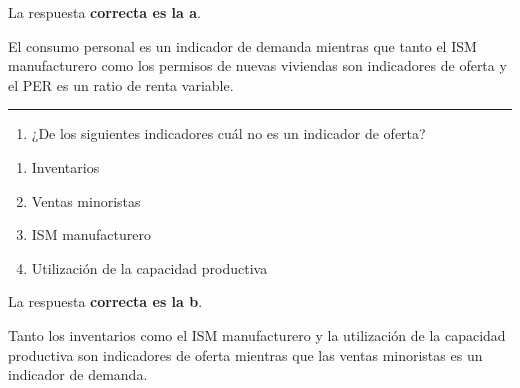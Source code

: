 \documentclass[
  letterpaper,
  DIV=11,
  numbers=noendperiod]{scrreprt}
\providecommand{\tightlist}{%
  \setlength{\itemsep}{0pt}\setlength{\parskip}{0pt}}\usepackage{longtable,booktabs,array}
\begin{document}
\begin{tcolorbox}[enhanced jigsaw, left=2mm, opacityback=0, colback=white, breakable, arc=.35mm, bottomrule=.15mm, rightrule=.15mm, toprule=.15mm, leftrule=.75mm, colframe=quarto-callout-tip-color-frame]
\begin{minipage}[t]{5.5mm}
\textcolor{quarto-callout-tip-color}{\faLightbulb}
\end{minipage}%
\begin{minipage}[t]{\textwidth - 5.5mm}

La respuesta \textbf{correcta es la a}.

El consumo personal es un indicador de demanda mientras que tanto el ISM
manufacturero como los permisos de nuevas viviendas son indicadores de
oferta y el PER es un ratio de renta variable.

\end{minipage}%
\end{tcolorbox}

\begin{center}\rule{0.5\linewidth}{0.5pt}\end{center}

\begin{enumerate}
\def\labelenumi{\arabic{enumi}.}
\setcounter{enumi}{28}
\tightlist
\item
  ¿De los siguientes indicadores cuál no es un indicador de oferta?
\end{enumerate}

\begin{enumerate}
\def\labelenumi{\alph{enumi})}
\item
  Inventarios
\item
  Ventas minoristas
\item
  ISM manufacturero
\item
  Utilización de la capacidad productiva
\end{enumerate}

\begin{tcolorbox}[enhanced jigsaw, left=2mm, opacityback=0, colback=white, breakable, arc=.35mm, bottomrule=.15mm, rightrule=.15mm, toprule=.15mm, leftrule=.75mm, colframe=quarto-callout-tip-color-frame]
\begin{minipage}[t]{5.5mm}
\textcolor{quarto-callout-tip-color}{\faLightbulb}
\end{minipage}%
\begin{minipage}[t]{\textwidth - 5.5mm}

La respuesta \textbf{correcta es la b}.

Tanto los inventarios como el ISM manufacturero y la utilización de la
capacidad productiva son indicadores de oferta mientras que las ventas
minoristas es un indicador de demanda.

\end{minipage}%
\end{tcolorbox}
\end{document}
